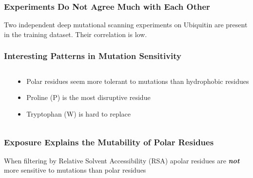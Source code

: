 \documentclass[10pt, british, luatex]{beamer}
\begin{document}
\begin{frame}
	\frametitle{Experiments Do Not Agree Much with Each Other}
	Two independent deep mutational scanning experiments on Ubiquitin are present in the training dataset.
	Their correlation is low.
	\vfill%
	\begin{center}
		{%
			\let\bfseries\sbseries%
			
		}
	\end{center}
\end{frame}

\begin{frame}
	\frametitle{Interesting Patterns in Mutation Sensitivity}
	\begin{columns}[c]
		\begin{column}{.5\textwidth}
			\vfill\vspace{-1.5em}\null%
			\begin{center}
				{%
					\let\bfseries\sbseries%
					
				}
			\end{center}
		\end{column}
		\begin{column}{.5\textwidth}
			\vspace{-7.5em}
			\begin{itemize}
				\item Polar residues seem more tolerant to mutations than hydrophobic residues
				\item Proline (P) is the most disruptive residue
				\item Tryptophan (W) is hard to replace
			\end{itemize}
		\end{column}
	\end{columns}
\end{frame}

\begin{frame}
	\frametitle{Exposure Explains the Mutability of Polar Residues}
	When filtering by Relative Solvent Accessibility (RSA) apolar residues are \textbf{\textit{not}} more sensitive to mutations than polar residues
	\vfill%
	\begin{center}
		{%
			\hspace{-2em}
			\let\bfseries\sbseries%
			
			\hspace{2em}%
			
		}
	\end{center}
\end{frame}
\end{document}
